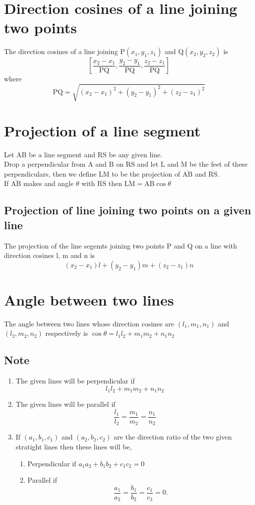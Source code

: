 \documentclass{article}
\theoremstyle{definition}
\begin{document}
\section*{Direction cosines of a line joining two points}
The direction cosines of a line joining $\text{P}(x_{1},y_{1},z_{1})$ and $\text{Q}(x_{2},y_{2},z_{2})$ is \[
	\left[ \frac{x_{2}-x_{1}}{\text{PQ}} , \frac{y_{2}- y_{1}}{\text{PQ}}, \frac{z_{2}-z_{1}}{\text{PQ}} \right]
\] where
\[
	\text{PQ} = \sqrt{(x_{2}-x_{1})^{2}+(y_{2}-y_{1})^{2}+(z_{2}-z_{1})^{2}}
\]

\section*{Projection of a line segment}
Let $\text{AB}$ be a line segment and $\text{RS}$ be any given line. \\
Drop a perpendicular from $\text{A}$ and $\text{B}$ on $\text{RS}$ and let $\text{L}$ and $\text{M}$ be the feet of these perpendiculars, then we define LM to be the projection of $\overline{\text{AB}}$ and $\overline{\text{RS}}$. \\
If $\overline{\text{AB}}$ makes and angle $\theta$ with $\overline{\text{RS}}$ then $\overline{\text{LM}}=\text{AB}\cos\theta$ \\
\subsection*{Projection of line joining two points on a given line}
The projection of the line segemts joining two points P and Q on a line with direction cosines l, m and n is \\ 
\[
	(x_{2}-x_{1})l + (y_{2}-y_{1})m + (z_{2}-z_{1})n
\]
\section*{Angle between two lines}
The angle between two lines whose direction cosines are $(l_{1}, m_{1}, n_{1})$ and $(l_{2},m_{2},n_{2})$ respectively is $\cos\theta = l_{1}l_{2}+m_{1}m_{2}+n_{1}n_{2}$
\subsection*{Note}

\begin{enumerate}
	\item The given lines will be perpendicular if 
		\[ l_{1}l_{2}+m_{1}m_{2}+n_{1}n_{2} \]
	\item The given lines will be parallel if 
		\[ \frac{l_{1}}{l_{2}} = \frac{m_{1}}{m_{2}} = \frac{n_{1}}{n_{2}} \]
	\item If $(a_{1}, b_{1},c_{1})$ and $(a_{2},b_{2},c_{2})$ are the direction ratio of the two given stratight lines then these lines will be, 
		\begin{enumerate}
			\item Perpendicular if $a_{1}a_{2}+b_{1}b_{2}+c_{1}c_{2} = 0$
			\item Parallel if \[
					\frac{a_{1}}{a_{2}}=\frac{b_{1}}{b_{2}} = \frac{c_{1}}{c_{2}} = 0
			.\] 
		\end{enumerate}
\end{enumerate}
\end{document}

